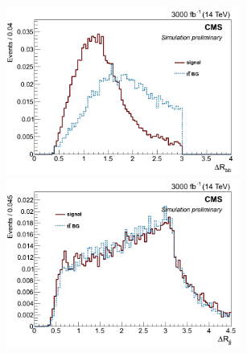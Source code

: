 \documentclass[10pt,a4paper]{article}
\newcommand{\ww}{7.7cm} %
\begin{document}
\begin{figure}[h]
	
  \begin{subfigure}[b]{17cm}
    \begin{minipage}[h!]{\ww}
      \centering
      \includegraphics[width=\ww]{figs/DeltaR_bb1.png}
    \end{minipage}
    \begin{minipage}[h!]{\ww}
      \centering
      \includegraphics[width=\ww]{figs/DeltaR_jj.png}
    \end{minipage}
  \end{subfigure}


\end{figure}
\end{document}
